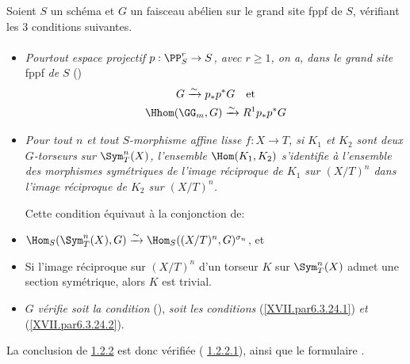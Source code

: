 \subsubsection{}
Soient $S$ un schéma et $G$ un faisceau abélien sur le grand site fppf
de $S$, vérifiant les 3 conditions suivantes.

\paragraph{}
\begin{itemize}
\item[(i)] \emph{Pour\pageoriginale tout espace projectif
$p:\PP^r_{S}\rightarrow S$, avec $r\geq 1$, on a, dans le grand
site} fppf \emph{de} $S$ ()
\begin{gather*}
G\xrightarrow{\sim} p_{\ast}p^{\ast}G\quad\mbox{et}\\
\Hhom(\GG_{m},G)\xrightarrow{\sim} R^{1}p_{\ast}p^{\ast}G
\end{gather*}
 
\item[(ii)] \emph{Pour tout $n$ et tout $S$-morphisme affine lisse
  $f:X\rightarrow 
T$, si $K_{1}$ et $K_{2}$ sont deux $G$-torseurs sur
$\Sym^{n}_{T}(X)$, l'ensemble $\Hom(K_{1},K_{2})$ s'identifie à
l'ensemble des morphismes symétriques de l'image réciproque de $K_{1}$
sur $(X/T)^{n}$ dans l'image réciproque de $K_{2}$ sur $(X/T)^{n}$.}

Cette condition équivaut à la conjonction de:

\item[${\rm (ii')}$]
$\Hom_{S}(\Sym^{n}_{T}(X),G)\xrightarrow{\sim}\Hom_{S}((X/T)^{n},
G)^{\sigma_n}$, et

\item[${\rm (ii'')}$] Si l'image réciproque sur $(X/T)^{n}$ d'un
torseur $K$ sur $\Sym^{n}_{T}(X)$ admet une section symétrique, alors
$K$ est trivial.

\item[(iii)] $G$ \emph{vérifie soit la condition} (),
\emph{soit les conditions} (\ref{XVII.par6.3.24.1}) \emph{et} (\ref{XVII.par6.3.24.2}).
\end{itemize}

La conclusion de \hyperref[XVIII.thm1.2.2]{1.2.2} est donc vérifiée (\cf
\hyperref[XVIII.par1.2.2.1]{1.2.2.1}), ainsi que le formulaire .

